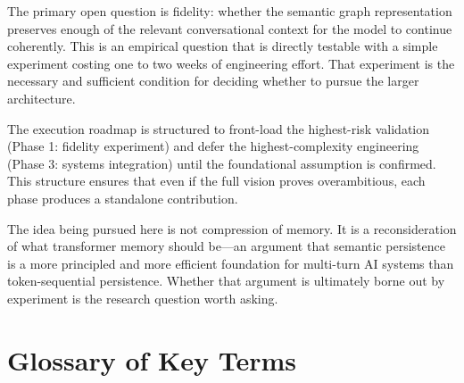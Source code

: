 \documentclass[11pt, a4paper, twoside]{article}
\theoremstyle{definition}
\begin{document}
The primary open question is fidelity: whether the semantic graph representation
preserves enough of the relevant conversational context for the model to continue
coherently. This is an empirical question that is directly testable with a simple
experiment costing one to two weeks of engineering effort. That experiment is
the necessary and sufficient condition for deciding whether to pursue the larger
architecture.

\medskip

The execution roadmap is structured to front-load the highest-risk validation
(Phase 1: fidelity experiment) and defer the highest-complexity engineering
(Phase 3: systems integration) until the foundational assumption is confirmed.
This structure ensures that even if the full vision proves overambitious, each
phase produces a standalone contribution.

The idea being pursued here is not compression of memory. It is a reconsideration
of what transformer memory should be---an argument that semantic persistence is a
more principled and more efficient foundation for multi-turn AI systems than
token-sequential persistence. Whether that argument is ultimately borne out by
experiment is the research question worth asking.

\appendix
\section{Glossary of Key Terms}
\label{app:glossary}
\end{document}
